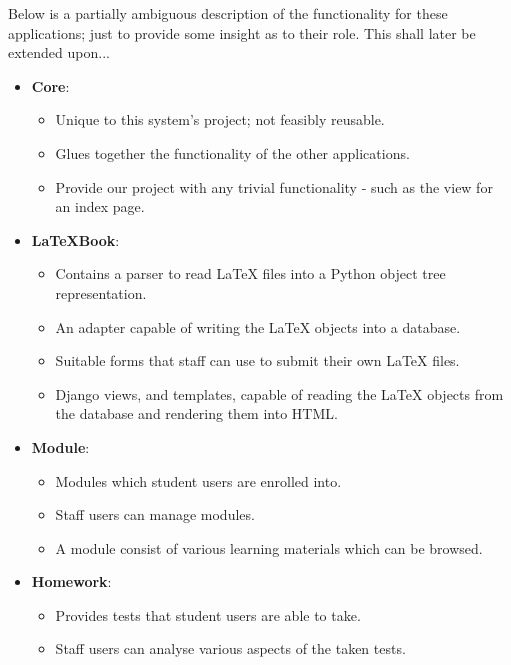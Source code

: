 		Below is a partially ambiguous description of the functionality for these applications; just to provide some insight as to their role. This shall later be extended upon...
		
		\begin{itemize}
			\item \textbf{Core}:
				\begin{itemize}
					\item Unique to this system's project; not feasibly reusable.
					\item Glues together the functionality of the other applications.
					\item Provide our project with any trivial functionality - such as the view for an index page.
				\end{itemize}

			\item \textbf{LaTeXBook}:
				\begin{itemize}
					\item Contains a parser to read LaTeX files into a Python object tree representation.
					\item An adapter capable of writing the LaTeX objects into a database.
					\item Suitable forms that staff can use to submit their own LaTeX files.
					\item Django views, and templates, capable of reading the LaTeX objects from the database and rendering them into HTML.
				\end{itemize}
				
			\item \textbf{Module}:
				\begin{itemize}
					\item Modules which student users are enrolled into.
					\item Staff users can manage modules.
					\item A module consist of various learning materials which can be browsed.
				\end{itemize} 

			\item \textbf{Homework}:
				\begin{itemize}
					\item Provides tests that student users are able to take.
					\item Staff users can analyse various aspects of the taken tests.
				\end{itemize} 
		\end{itemize}